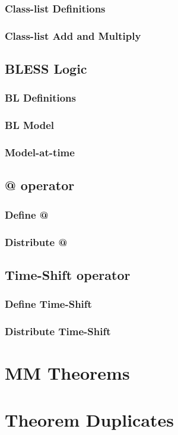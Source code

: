 \documentclass[fleqn,openany]{book}
\begin{document}
\subsection{Class-list Definitions}

\subsection{Class-list Add and Multiply}


\section{BLESS Logic}
\subsection{BL Definitions}

\subsection{BL Model}

\subsection{Model-at-time}


\section{ @ operator}
\subsection{Define @}

\subsection{Distribute @}


\section{ Time-Shift operator}
\subsection{Define Time-Shift}

\subsection{Distribute Time-Shift}





\chapter{MM Theorems}


\chapter{Theorem Duplicates}

\wland*

\printindex
\end{document}
